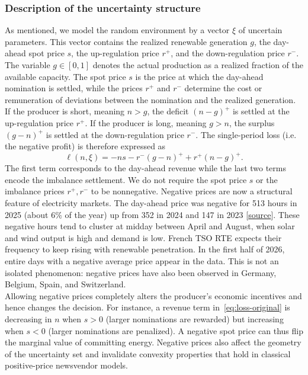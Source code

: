 \documentclass[11pt]{article}
\theoremstyle{plain}
\theoremstyle{definition}
\begin{document}
\subsubsection{Description of the uncertainty structure}
As mentioned, we model the random environment by a vector $\xi$ of uncertain parameters. 
This vector contains the realized renewable generation $g$, the day-ahead spot price $s$, the up-regulation price $r^+$, and the down-regulation price $r^-$. 
The variable $g\in[0,1]$ denotes the actual production as a realized fraction of the available capacity. 
The spot price $s$ is the price at which the day-ahead nomination is settled, while the prices $r^+$ and $r^-$ determine the cost or remuneration of deviations between the nomination and the realized generation. 
If the producer is short, meaning $n>g$, the deficit $(n-g)^+$ is settled at the up-regulation price $r^+$. 
If the producer is long, meaning $g>n$, the surplus $(g-n)^+$ is settled at the down-regulation price $r^-$. 
The single-period loss (i.e. the negative profit) is therefore expressed as 
\begin{equation} 
    \label{eq:loss-original} 
    \ell(n,\xi) = -ns - r^-(g-n)^+ + r^+(n-g)^+ . 
\end{equation} 
The first term corresponds to the day-ahead revenue while the last two terms encode the imbalance settlement. 
We do not require the spot price $s$ or the imbalance prices $r^+, r^-$ to be nonnegative.
Negative prices are now a structural feature of electricity markets.
The day-ahead price was negative for 513 hours in 2025 (about $6\%$ of the year) up from 352 in 2024 and 147 in 2023 \color{red}[\href{https://analysesetdonnees.rte-france.com/bilan-electrique-2025/prix#Heuresaprixnegatif}{source}]\color{black}. 
These negative hours tend to cluster at midday between April and August, when solar and wind output is high and demand is low.
French TSO RTE expects their frequency to keep rising with renewable penetration.
In the first half of 2026, entire days with a negative average price appear in the data.
This is not an isolated phenomenon: negative prices have also been observed in Germany, Belgium, Spain, and Switzerland.
\\

\noindent Allowing negative prices completely alters the producer's economic incentives and hence changes the decision. 
For instance, a revenue term in~\eqref{eq:loss-original} is decreasing in $n$ when $s>0$ (larger nominations are rewarded) but increasing when $s<0$ (larger nominations are penalized).
A negative spot price can thus flip the marginal value of committing energy. 
Negative prices also affect the geometry of the uncertainty set and invalidate convexity properties that hold in classical positive-price newsvendor models. 
\\
\end{document}
